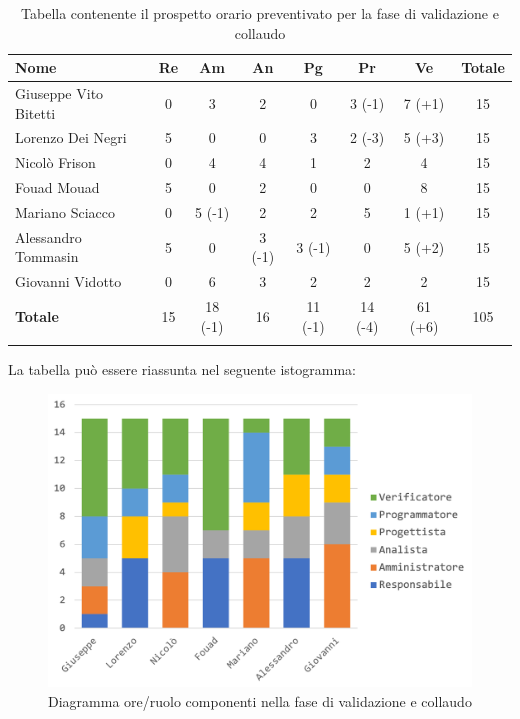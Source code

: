 		\begin{longtable}{|l|c|c|c|c|c|c|c|}
			\hline
			\rowcolor{lighter-grayer}
			\textbf{Nome} & \textbf{Re} & \textbf{Am} & \textbf{An} & \textbf{Pg}  & \textbf{Pr}   & \textbf{Ve} & \textbf{Totale} \\
			\hline
			\endfirsthead
			
			\hline
			Giuseppe Vito Bitetti 		 & 0 & 3 & 2 & 0 & 3 (-1) & 7 (+1) & 15\\
			\hline
			\hline
			Lorenzo Dei Negri			 & 5 & 0 & 0 & 3 & 2 (-3) & 5 (+3) & 15\\
			\hline
			\hline
			Nicolò Frison				      & 0 & 4 & 4 & 1 & 2 & 4 & 15\\
			\hline
			\hline
			Fouad Mouad 				   & 5 & 0 & 2 & 0 & 0 & 8 & 15\\
			\hline
			\hline
			Mariano Sciacco 			 & 0 & 5 (-1) & 2 & 2 & 5 & 1 (+1) & 15\\
			\hline
			\hline
			Alessandro Tommasin    & 5 & 0 & 3 (-1) & 3 (-1) & 0 & 5 (+2) & 15\\
			\hline
			\hline
			Giovanni Vidotto 			  & 0 & 6 & 3 & 2 & 2 & 2 & 15\\
			\hline 
			\textbf{Totale}			 	& 15 & 18 (-1) & 16 & 11 (-1) & 14 (-4) & 61 (+6) & 105\\
			\hline
			\caption{Tabella contenente il prospetto orario preventivato per la fase di validazione e collaudo}
		\end{longtable}
		\pagebreak
		
		La tabella può essere riassunta nel seguente istogramma:
		\begin{figure}[H]
			\centering
			\includegraphics[width=0.8\linewidth]{./images/consuntivo/validCollCons1.png}
			\caption{Diagramma ore/ruolo componenti nella fase di validazione e collaudo}
			\label{fig:diagramma suddivione ruoli fase di validazione e collaudo}
		\end{figure}

